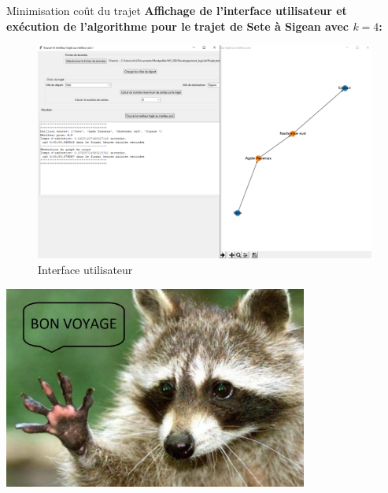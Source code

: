 \documentclass{beamer}
\begin{document}
	\begin{frame}{Minimisation coût du trajet}
		\scriptsize
		\textbf{Affichage de l'interface utilisateur et exécution de l'algorithme pour le} \textbf{trajet de Sete à  Sigean avec $k = 4$:}
		\begin{figure}
			\begin{center}
				\includegraphics[scale=0.22]{UI.png}
				\caption{\scriptsize Interface utilisateur }
			\end{center}
		\end{figure} 
	\end{frame}


\begin{frame}{}
\includegraphics[width=10cm]{Racoon.jpg}
\end{frame}
\end{document}

